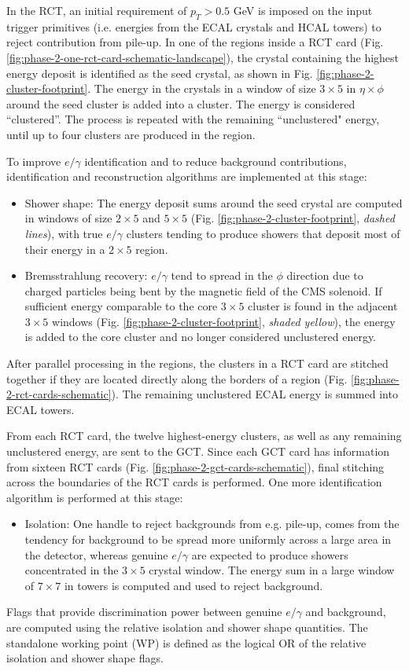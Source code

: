 In the RCT, an initial requirement of $p_{T} > 0.5$ GeV is imposed on the input trigger primitives (i.e. energies from the ECAL crystals and HCAL towers) to reject contribution from pile-up. In one of the regions inside a RCT card (Fig. \ref{fig:phase-2-one-rct-card-schematic-landscape}), the crystal containing the highest energy deposit is identified as the seed crystal, as shown in Fig. \ref{fig:phase-2-cluster-footprint}. The energy in the crystals in a window of size $3\times 5$ in $\eta\times\phi$ around the seed cluster is added into a cluster. The energy is considered ``clustered''. The process is repeated with the remaining ``unclustered" energy, until up to four clusters are produced in the region. 

To improve $e/\gamma$ identification and to reduce background contributions, identification and reconstruction algorithms are implemented at this stage:
\begin{itemize}
    \item Shower shape: The energy deposit sums around the seed crystal are computed in windows of size $2 \times 5$ and $5 \times 5$ (Fig. \ref{fig:phase-2-cluster-footprint}, \textit{dashed lines}), with true $e/\gamma$ clusters tending to produce showers that deposit most of their energy in a $2 \times 5$ region. 
    \item Bremsstrahlung recovery: $e/\gamma$ tend to spread in the $\phi$ direction due to charged particles being bent by the magnetic field of the CMS solenoid. If sufficient energy comparable to the core $3 \times 5$ cluster is found in the adjacent $3 \times 5$ windows (Fig. \ref{fig:phase-2-cluster-footprint}, \textit{shaded yellow}), the energy is added to the core cluster and no longer considered unclustered energy.
\end{itemize}

After parallel processing in the regions, the clusters in a RCT card are stitched together if they are located directly along the borders of a region (Fig. \ref{fig:phase-2-rct-cards-schematic}). The remaining unclustered ECAL energy is summed into ECAL towers. 

From each RCT card, the twelve highest-energy clusters, as well as any remaining unclustered energy, are sent to the GCT. Since each GCT card has information from sixteen RCT cards (Fig. \ref{fig:phase-2-gct-cards-schematic}), final stitching across the boundaries of the RCT cards is performed. One more identification algorithm is performed at this stage:
\begin{itemize}
    \item Isolation: One handle to reject backgrounds from e.g. pile-up, comes from the tendency for background to be spread more uniformly across a large area in the detector, whereas genuine $e/\gamma$ are expected to produce showers concentrated in the $3 \times 5$ crystal window. The energy sum in a large window of $7 \times 7$ in towers is computed and used to reject background.
\end{itemize}
Flags that provide discrimination power between genuine $e/\gamma$ and background, are computed using the relative isolation and shower shape quantities. The standalone working point (WP) is defined as the logical OR of the relative isolation and shower shape flags. 

